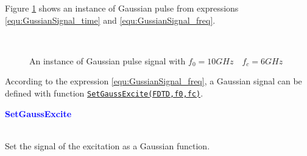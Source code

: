 Figure \ref{fig:GaussInpulseTheory} shows an instance of Gaussian pulse from expressions \ref{equ:GussianSignal_time} and \ref{equ:GussianSignal_freq}. 
    \begin{figure}[hbt]
	      \centering
	      \\
	      \caption[Gaussian pulse signal]{An instance of Gaussian pulse signal with $f_0=10GHz \quad f_c=6GHz$}
	      \label{fig:GaussInpulseTheory}
    \end{figure}
According to the expression \ref{equ:GussianSignal_freq}, a Gaussian signal can be defined with function \hyperref[func:SetGaussExcite]{\texttt{SetGaussExcite(FDTD,f0,fc)}}.

\textcolor{blue}{\begin{large}\textbf{SetGaussExcite}	\end{large}} \label{func:SetGaussExcite}\\
	  Set the signal of the excitation as a Gaussian function.

